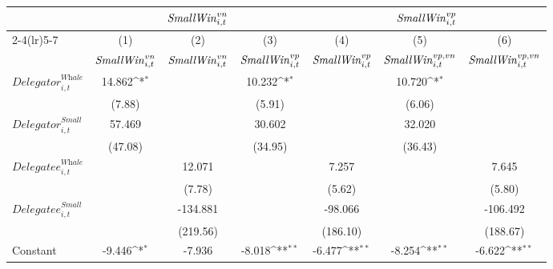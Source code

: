 {
\def\sym#1{\ifmmode^{#1}\else\(^{#1}\)\fi}
\begin{tabular}{l*{6}{c}}
\toprule
                    &\multicolumn{3}{c}{${\it Small Win}^{vn}_{i,t}$}                 &\multicolumn{3}{c}{${\it Small Win}^{vp}_{i,t}$}                 \\\cmidrule(lr){2-4}\cmidrule(lr){5-7}
                    &\multicolumn{1}{c}{(1)}&\multicolumn{1}{c}{(2)}&\multicolumn{1}{c}{(3)}&\multicolumn{1}{c}{(4)}&\multicolumn{1}{c}{(5)}&\multicolumn{1}{c}{(6)}\\
                    &\multicolumn{1}{c}{${\it Small Win}^{vn}_{i,t}$}&\multicolumn{1}{c}{${\it Small Win}^{vn}_{i,t}$}&\multicolumn{1}{c}{${\it Small Win}^{vp}_{i,t}$}&\multicolumn{1}{c}{${\it Small Win}^{vp}_{i,t}$}&\multicolumn{1}{c}{${\it Small Win}^{vp,vn}_{i,t}$}&\multicolumn{1}{c}{${\it Small Win}^{vp,vn}_{i,t}$}\\
\midrule
$\textit{Delegator}_{i,t}^{\textit{Whale}}$&      14.862\sym{*}  &                     &      10.232\sym{*}  &                     &      10.720\sym{*}  &                     \\
                    &      (7.88)         &                     &      (5.91)         &                     &      (6.06)         &                     \\
$\textit{Delegator}_{i,t}^{\textit{Small}}$&      57.469         &                     &      30.602         &                     &      32.020         &                     \\
                    &     (47.08)         &                     &     (34.95)         &                     &     (36.43)         &                     \\
$\textit{Delegatee}_{i,t}^{\textit{Whale}}$&                     &      12.071         &                     &       7.257         &                     &       7.645         \\
                    &                     &      (7.78)         &                     &      (5.62)         &                     &      (5.80)         \\
$\textit{Delegatee}_{i,t}^{\textit{Small}}$&                     &    -134.881         &                     &     -98.066         &                     &    -106.492         \\
                    &                     &    (219.56)         &                     &    (186.10)         &                     &    (188.67)         \\
Constant            &      -9.446\sym{*}  &      -7.936         &      -8.018\sym{**} &      -6.477\sym{**} &      -8.254\sym{**} &      -6.622\sym{**} \\

\end{tabular}}

